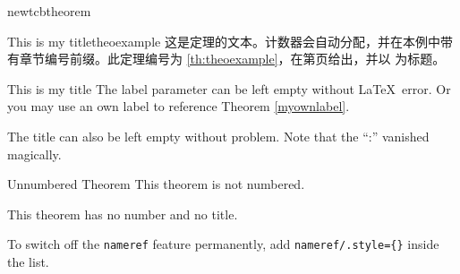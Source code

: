 \begin{docCommand}[doc updated=2016-06-22]{newtcbtheorem}{}
\begin{dispExample}
\begin{mytheo}{This is my title}{theoexample}
这是定理的文本。计数器会自动分配，并在本例中带有章节编号前缀。此定理编号为%
\ref{th:theoexample}，在第\pageref{th:theoexample}页给出，并以%
\flqq{}\frqq 为标题。
\end{mytheo}
\end{dispExample}

\begin{dispExample}
\begin{mytheo}[label=myownlabel]{This is my title}{}
  The label parameter can be left empty without \LaTeX\ error.
  Or you may use an own label to reference Theorem \ref{myownlabel}.
\end{mytheo}
\end{dispExample}

\begin{dispExample}
\begin{mytheo}{}{}
  The title can also be left empty without problem. Note that the \enquote{:}
  vanished magically.
\end{mytheo}
\end{dispExample}

\begin{dispExample}
\begin{mytheo*}{Unnumbered Theorem}
  This theorem is not numbered.
\end{mytheo*}
\end{dispExample}

\begin{dispExample}
\begin{mytheo*}{}
  This theorem has no number and no title.
\end{mytheo*}
\end{dispExample}

\begin{marker}
To switch off the \texttt{nameref} feature permanently, add
\mbox{\texttt{nameref/.style=\{\}}} inside the  list.
\end{marker}

\end{docCommand}




